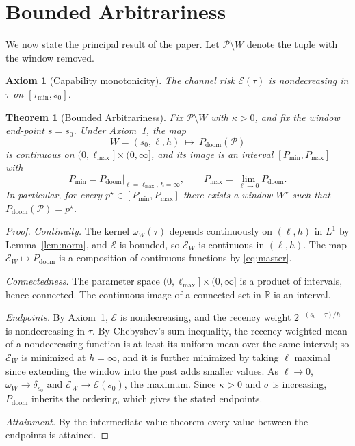 \documentclass[11pt]{article}
\newtheorem{axiom}{Axiom}[section]
\newtheorem{theorem}{Theorem}[section]
\theoremstyle{remark}
\newcommand{\PD}{P_{\mathrm{doom}}}
\newcommand{\R}{\mathbb{R}}
\begin{document}
\section{Bounded Arbitrariness}\label{sec:arb}

We now state the principal result of the paper. Let $\mathcal{P}\setminus W$ denote the tuple with the window removed.

\begin{axiom}[Capability monotonicity]\label{ax:mono}
The channel risk $\mathcal{E}(\tau)$ is nondecreasing in $\tau$ on $[\tau_{\min},s_0]$.
\end{axiom}

\begin{theorem}[Bounded Arbitrariness]\label{thm:arb}
Fix $\mathcal{P}\setminus W$ with $\kappa>0$, and fix the window end-point $s=s_0$. Under Axiom~\ref{ax:mono}, the map
\[
W=(s_0,\ell,h)\ \longmapsto\ \PD(\mathcal{P})
\]
is continuous on $(0,\ell_{\max}]\times(0,\infty]$, and its image is an interval $[P_{\min},P_{\max}]$ with
\[
P_{\min}=\PD\bigl|_{\ell=\ell_{\max},\,h=\infty},\qquad
P_{\max}=\lim_{\ell\to 0}\PD .
\]
In particular, for every $p^{\star}\in[P_{\min},P_{\max}]$ there exists a window $W^{\star}$ such that $\PD(\mathcal{P})=p^{\star}$.
\end{theorem}

\begin{proof}
\emph{Continuity.} The kernel $\omega_W(\tau)$ depends continuously on $(\ell,h)$ in $L^1$ by Lemma~\ref{lem:norm}, and $\mathcal{E}$ is bounded, so $\mathcal{E}_W$ is continuous in $(\ell,h)$. The map $\mathcal{E}_W\mapsto\PD$ is a composition of continuous functions by \eqref{eq:master}.

\emph{Connectedness.} The parameter space $(0,\ell_{\max}]\times(0,\infty]$ is a product of intervals, hence connected. The continuous image of a connected set in $\R$ is an interval.

\emph{Endpoints.} By Axiom~\ref{ax:mono}, $\mathcal{E}$ is nondecreasing, and the recency weight $2^{-(s_0-\tau)/h}$ is nondecreasing in $\tau$. By Chebyshev's sum inequality, the recency-weighted mean of a nondecreasing function is at least its uniform mean over the same interval; so $\mathcal{E}_W$ is minimized at $h=\infty$, and it is further minimized by taking $\ell$ maximal since extending the window into the past adds smaller values. As $\ell\to 0$, $\omega_W\to\delta_{s_0}$ and $\mathcal{E}_W\to\mathcal{E}(s_0)$, the maximum. Since $\kappa>0$ and $\sigma$ is increasing, $\PD$ inherits the ordering, which gives the stated endpoints.

\emph{Attainment.} By the intermediate value theorem every value between the endpoints is attained. \qedhere
\end{proof}
\end{document}
